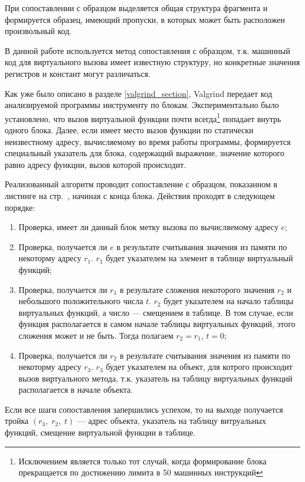 \documentclass[a4paper,12pt,russian]{article}
\newcommand{\code}[1]{\textsf{#1}}
\begin{document}
При сопоставлении с образцом выделяется общая структура фрагмента и формируется образец, имеющий пропуски, в которых может быть расположен произвольный код.

В данной работе используется метод сопоставления с образцом, т.к. машинный код для виртуального вызова имеет известную структуру, но конкретные значения регистров и констант могут различаться.

Как уже было описано в разделе \ref{valgrind_section}, \code{Valgrind} передает код анализируемой программы инструменту по блокам. Экспериментально было установлено, что вызов виртуальной функции почти всегда\footnote{Исключением является только тот случай, когда формирование блока прекращается по достижению лимита в 50 машинных инструкций} попадает внутрь одного блока.
Далее, если имеет место вызов функции по статически неизвестному адресу, вычисляемому во время работы программы, формируется специальный указатель для блока, содержащий выражение, значение которого равно адресу функции, вызов которой происходит.

Реализованный алгоритм проводит сопоставление с образцом, показанном в листинге на стр.~\pageref{vcall_valgrind_listing}, начиная с конца блока.
Действия проходят в следующем порядке:
\begin{enumerate}
    \item Проверка, имеет ли данный блок метку вызова по вычисляемому адресу $e$;
    \item Проверка, получается ли $e$ в результате считывания значения из памяти по некоторму адресу $r_1$. $r_1$ будет указателем на элемент в таблице виртуальный функций;
    \item Проверка, получается ли $r_1$ в результате сложения некоторого значения $r_2$ и небольшого положительного числа $t$. $r_2$ будет указателем на начало таблицы виртуальных функций, а число --- смещением в таблице. В том случае, если функция располагается в самом начале таблицы виртуальных функций, этого сложения может и не быть. Тогда полагаем $r_2 = r_1$, $t = 0$;
    \item Проверка, получается ли $r_2$ в результате считывания значения из памяти по некоторму адресу $r_3$. $r_3$ будет указателем на объект, для котрого происходит вызов виртуального метода, т.к. указатель на таблицу виртуальных функций располагается в начале объекта.
\end{enumerate}

Если все шаги сопоставления запершились успехом, то на выходе получается тройка $(r_3,\;r_2,\;t)$ --- адрес объекта, указатель на таблицу витруальных функций, смещение виртуальной функции в таблице.
\end{document}
